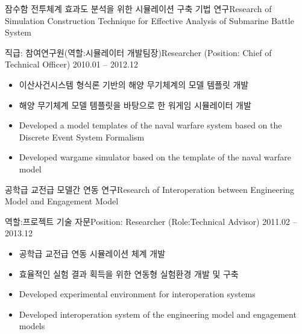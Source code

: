 \documentclass[english,full]{resume_structure}
\begin{document}
\begin{Project}
{잠수함 전투체계 효과도 분석을 위한 시뮬레이션 구축 기법 연구}{Research of Simulation Construction Technique for Effective Analysis of Submarine Battle System}
{}{} 
{
\ResumeSubSection %
    {직급: 참여연구원(역할:시뮬레이터 개발팀장)}{Researcher (Position: Chief of Technical Officer)}
    {2010.01 -- 2012.12}
    {
      \begin{itemize}
       \item 이산사건시스템 형식론 기반의 해양 무기체계의 모델 템플릿 개발
       \item 해양 무기체계 모델 템플릿을 바탕으로 한 워게임 시뮬레이터 개발
      \end{itemize}
    }
    {
      \begin{itemize}
        \item Developed a model templates of the naval warfare system based on the Discrete Event System Formalism
        \item Developed wargame simulator based on the template of the naval warfare model
     \end{itemize}
    }
}

{공학급 교전급 모델간 연동 연구}{Research of Interoperation between Engineering Model and Engagement Model}
{}{} 
{
\ResumeSubSection %
    {역할:프로젝트 기술 자문}{Position: Researcher (Role:Technical Advisor)}
    {2011.02 -- 2013.12}
    {
      \begin{itemize}
        \item 공학급 교전급 연동 시뮬레이션 체계 개발
        \item 효율적인 실험 결과 획득을 위한 연동형 실험환경 개발 및 구축
      \end{itemize}
   }
    {
      \begin{itemize}
       \item Developed experimental environment for interoperation systems
       \item Developed interoperation system of the engineering model and engagement models
      \end{itemize}
    }
}


\end{Project}
\end{document}
